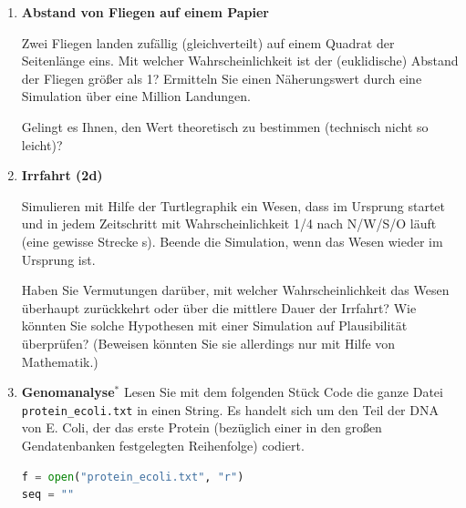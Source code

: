 \begin{enumerate}[1.]



\item \textbf{Abstand von Fliegen auf einem Papier}

Zwei Fliegen landen zufällig (gleichverteilt) auf einem Quadrat der 
Seitenlänge  eins. Mit welcher Wahrscheinlichkeit ist der (euklidische) Abstand
der Fliegen größer als 1?
Ermitteln Sie einen Näherungswert durch eine Simulation
über eine Million Landungen. 

Gelingt es Ihnen, den Wert theoretisch zu bestimmen (technisch nicht so leicht)?


\item \textbf{Irrfahrt (2d)}

Simulieren mit Hilfe der Turtlegraphik ein Wesen, 
dass im Ursprung startet und in jedem Zeitschritt mit Wahrscheinlichkeit 1/4 
nach N/W/S/O läuft (eine gewisse Strecke s). 
Beende die Simulation, wenn das Wesen wieder im Ursprung ist.


Haben Sie Vermutungen darüber, mit welcher Wahrscheinlichkeit das Wesen überhaupt
zurückkehrt oder über die mittlere Dauer der Irrfahrt?   Wie könnten Sie solche
Hypothesen mit einer Simulation auf Plausibilität überprüfen? (Beweisen könnten
Sie sie allerdings nur mit Hilfe von Mathematik.)



\item \textbf{Genomanalyse$^*$}
Lesen Sie mit dem folgenden Stück Code die ganze Datei \verb|protein_ecoli.txt| in einen
String. Es handelt sich um den Teil der DNA von E. Coli, der  das erste Protein (bezüglich
einer in den großen Gendatenbanken festgelegten Reihenfolge) codiert.
\begin{lstlisting}[language=Python]
f = open("protein_ecoli.txt", "r")
seq = ""


\end{lstlisting}
\end{enumerate}
